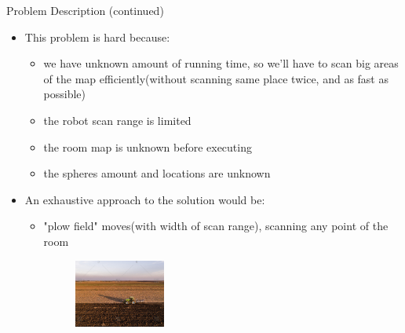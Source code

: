 \documentclass[10pt]{beamer}
\begin{document}
\begin{frame}{Problem Description (continued)}
\begin{itemize}
    \item This problem is hard because: 
    \begin{itemize}
    \item we have unknown amount of running time, so we'll have to scan big areas of the map efficiently(without scanning same place twice, and as fast as possible)
    \item the robot scan range is limited
    \item the room map is unknown before executing
     \item the spheres amount and locations are unknown
\end{itemize}
    \item An exhaustive approach to the solution would be:
    \begin{itemize}
    \item "plow field" moves(with width of scan range), scanning any point of the room
    \begin{figure}[t]
		\centering
		\includegraphics[width=0.3\textwidth]{images/plow.jpg}
    \end{figure}\hfill
\end{itemize}
\end{itemize}
\end{frame}
\end{document}
